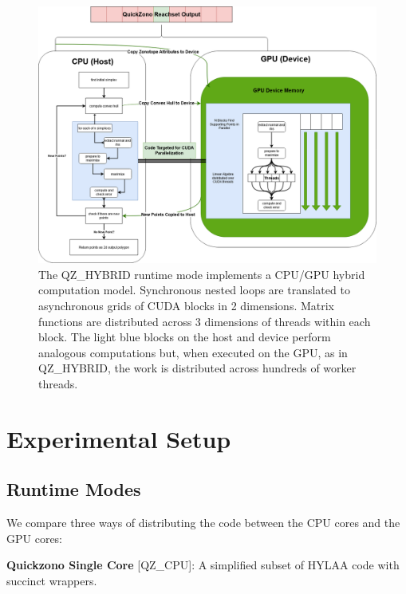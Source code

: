 \documentclass[runningheads]{llncs}
\begin{document}
\begin{figure}[t]
\includegraphics[width=\textwidth]{QZ_HYBRID_COMPUTATION.png}
\caption{The QZ\_HYBRID runtime mode implements a CPU/GPU hybrid computation model. Synchronous nested loops are translated to asynchronous grids of CUDA blocks in 2 dimensions. Matrix functions are distributed across 3 dimensions of threads within each block. The light blue blocks on the host and device perform analogous computations but, when executed on the GPU, as in QZ\_HYBRID, the work is distributed across hundreds of worker threads.} \label{fig:HybridComp}
\end{figure}
\section{Experimental Setup}


\subsection{Runtime Modes}
We compare three ways of distributing the code between the CPU cores and the GPU cores:

\textbf{Quickzono Single Core} [QZ\_CPU]: A simplified subset of HYLAA code with succinct wrappers. 
\end{document}
